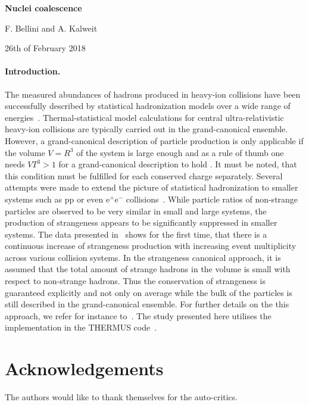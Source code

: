 \documentclass[a4paper,11pt]{scrartcl} %
\begin{document}
\begin{center}
{\Large {\bf Nuclei coalescence}}

\medskip

F. Bellini and A. Kalweit

\medskip

26th of February 2018
\end{center}

\bigskip

%
%




\paragraph{Introduction.} 
The measured abundances of hadrons produced in heavy-ion collisions have been successfully described by statistical hadronization models over a wide range of energies~\cite{Andronic:2011yq,Cleymans:1998fq,Andronic:2005yp}. Thermal-statistical model calculations for central ultra-relativistic heavy-ion collisions are typically carried out in the grand-canonical ensemble. However, a grand-canonical description of particle production is only applicable if the volume $V=R^{3}$ of the system is large enough and as a rule of thumb one needs $VT^{3} > 1$ for a grand-canonical description to hold \cite{Hagedorn:1984uy,Rafelski:1980gk}. It must be noted, that this condition must be fulfilled for each conserved charge separately.
Several attempts were made to extend the picture of statistical hadronization to smaller systems such as pp or even e$^{+}$e$^{-}$ collisions~\cite{Redlich:2009xx,Becattini:1996gy,Kraus:2008fh}. While particle ratios of non-strange particles are observed to be very similar in small and large systems, the production of strangeness appears to be significantly suppressed in smaller systems. The data presented in~\cite{Adam:2016emw} shows for the first time, that there is a continuous increase of strangeness production with increasing event multiplicity across various collision systems. In the strangeness canonical approach, it is assumed that the total amount of strange hadrons in the volume is small with respect to non-strange hadrons. Thus the conservation of strangeness is guaranteed explicitly and not only on average while the bulk of the particles is still described in the grand-canonical ensemble. For further details on the this approach, we refer for instance to~\cite{BraunMunzinger:2003zd,BraunMunzinger:2001as,Hamieh:2000tk,Cleymans:2004bf,Kraus:2007hf}. The study presented here utilises the implementation in the THERMUS code~\cite{Wheaton:2004qb}. 




\newenvironment{acknowledgement}{\relax}{\relax}
\begin{acknowledgement}
\section*{Acknowledgements}

The authors would like to thank themselves for the auto-critics.

\end{acknowledgement}




 	

\end{document}
